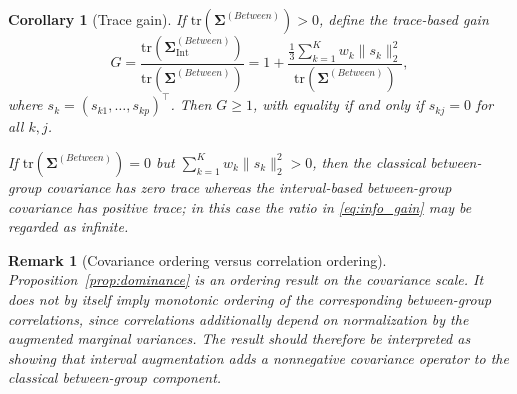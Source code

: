 \documentclass[preprint, times, 12pt, authoryear]{elsarticle}
\newtheorem{corollary}[theorem]{Corollary}
\newtheorem{remark}{Remark}
\begin{document}
 \begin{corollary}[Trace gain]\label{cor:trace_gain}
 	If $\mathrm{tr}(\boldsymbol{\Sigma}^{(Between)})>0$, define the trace-based gain
 	\begin{equation}\label{eq:info_gain}
 		G
 		=
 		\frac{\mathrm{tr}(\boldsymbol{\Sigma}_{\mathrm{Int}}^{(Between)})}
 		{\mathrm{tr}(\boldsymbol{\Sigma}^{(Between)})}
 		=
 		1+
 		\frac{\frac13\sum_{k=1}^K w_k\|s_k\|_2^2}
 		{\mathrm{tr}(\boldsymbol{\Sigma}^{(Between)})},
 	\end{equation}
 	where $s_k=(s_{k1},\ldots,s_{kp})^\top$. Then $G\ge 1$, with equality if and only if $s_{kj}=0$ for all $k,j$.
 	
 	If $\mathrm{tr}(\boldsymbol{\Sigma}^{(Between)})=0$ but $\sum_{k=1}^K w_k\|s_k\|_2^2>0$, then the classical between-group covariance has zero trace whereas the interval-based between-group covariance has positive trace; in this case the ratio in \eqref{eq:info_gain} may be regarded as infinite.
 \end{corollary}
 
\begin{remark}[Covariance ordering versus correlation ordering]
	Proposition~\ref{prop:dominance} is an ordering result on the covariance scale. It does not by itself imply monotonic ordering of the corresponding between-group correlations, since correlations additionally depend on normalization by the augmented marginal variances. The result should therefore be interpreted as showing that interval augmentation adds a nonnegative covariance operator to the classical between-group component.
\end{remark}
\end{document}
